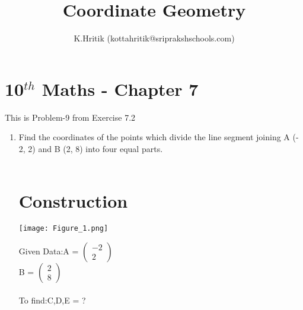\documentclass[journal,10pt,twocolumn]{article}
\title{Coordinate Geometry}
\author{K.Hritik (kottahritik@sriprakshschools.com)}
\newcommand{\myvec}[1]{\ensuremath{\begin{pmatrix}#1\end{pmatrix}}}
\begin{document}
\maketitle
\section*{10$^{th}$ Maths - Chapter 7}
This is Problem-9 from Exercise 7.2
\begin{enumerate}
\item Find the coordinates of the points which divide the line segment joining A (- 2, 2) and B (2, 8) into four equal parts.  \\
\solution \\
\section*{Construction}
 	\begin{center}
  \texttt{[image: Figure\_1.png]}
 
 \end{center}
Given Data:A = \myvec{-2\\2}\\
           B = \myvec{2\\8}\\
\\To find:C,D,E = ?\\


\end{enumerate}
\end{document}
